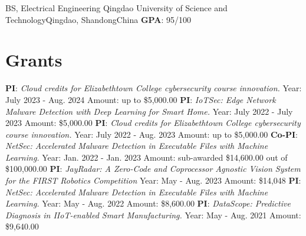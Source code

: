 \documentclass[11pt]{moderncv}
\begin{document}
        {BS, Electrical Engineering}
        {Qingdao University of Science and Technology}{Qingdao, Shandong}{China}
        {\textbf{GPA}: 95/100        
        }

\section{Grants}
%
{\textbf{PI}: \textit{Cloud credits for Elizabethtown College cybersecurity course innovation.} \newline
	Year: July 2023 - Aug. 2024 \newline
	Amount: up to \$5,000.00
}
%
{\textbf{PI}: \textit{IoTSec: Edge Network Malware Detection with Deep Learning for Smart Home.} \newline
	Year: July 2022 - July 2023 \newline
	Amount: \$5,000.00
}
%
{\textbf{PI}: \textit{Cloud credits for Elizabethtown College cybersecurity course innovation.} \newline
	Year: July 2022 - Aug. 2023 \newline
	Amount: up to \$5,000.00
}
%
{\textbf{Co-PI}: \textit{NetSec: Accelerated Malware Detection in Executable Files with Machine Learning.} \newline
	Year: Jan. 2022 - Jan. 2023 \newline
	Amount: sub-awarded \$14,600.00 out of \$100,000.00
}
%
{\textbf{PI}: \textit{JayRadar: A Zero-Code and Coprocessor Agnostic Vision System for the FIRST Robotics Competition} \newline
	Year: May - Aug. 2023 \newline
	Amount: \$14,048
}
%
{\textbf{PI}: \textit{NetSec: Accelerated Malware Detection in Executable Files with Machine Learning.} \newline
	Year: May - Aug. 2022 \newline
	Amount: \$8,600.00
}
%
{\textbf{PI}: \textit{DataScope: Predictive Diagnosis in IIoT-enabled Smart Manufacturing.} \newline
	Year: May - Aug. 2021 \newline
	Amount: \$9,640.00
}
\end{document}
